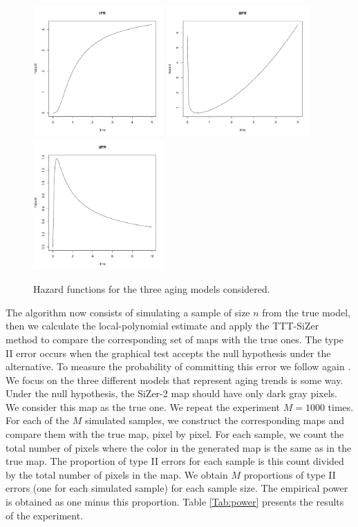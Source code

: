 \documentclass[preprint,12pt]{elsarticle}
\begin{document}
\begin{figure}[h]\centering
        \includegraphics[height=5cm]{IFR_model}
				\includegraphics[height=5cm]{BFR_3weibull}
				\includegraphics[height=5cm]{ufr_lnorm1-05}
\caption{{Hazard functions for the three aging models considered}.} \label{models}
\end{figure}

The algorithm now consists of simulating a sample of size $n$ from the true model, then we calculate the local-polynomial estimate and apply the TTT-SiZer method to compare the corresponding set of maps with the true ones.
The type II error occurs when the graphical test accepts the null hypothesis under the alternative. To measure the probability of committing this error we follow again \cite{RMP07}. We focus on the three different models that represent aging trends is some way. Under the null  hypothesis, the SiZer-2 map  should have only dark gray pixels. We consider this map as the true one. We repeat the experiment $M=1000$ times.  For each of the $M$ simulated samples, we construct the corresponding maps and compare them with the true map, pixel by pixel. For each sample, we count the total number of pixels where the color in the generated map is  the same as in the true map. The proportion of type II errors for each sample is this count divided by the total number of pixels in the map. We obtain $M$ proportions of type II errors (one for each simulated sample) for each sample size. The empirical power is obtained as one minus this proportion. Table \ref{Tab:power} presents the results of the experiment.
\end{document}
